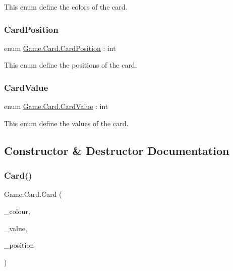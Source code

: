 This enum define the colors of the card. \mbox{\label{class_game_1_1_card_a9b35cee58d08386bc6f1d3cc7e6c6999}} 
\subsubsection{\texorpdfstring{Card\+Position}{CardPosition}}
{\footnotesize\ttfamily enum \hyperlink{class_game_1_1_card_a9b35cee58d08386bc6f1d3cc7e6c6999}{Game.\+Card.\+Card\+Position} \+: int\hspace{0.3cm}{\ttfamily [strong]}}

This enum define the positions of the card. \mbox{\label{class_game_1_1_card_a17c2bb5fb12e206639e218492d78578a}} 
\subsubsection{\texorpdfstring{Card\+Value}{CardValue}}
{\footnotesize\ttfamily enum \hyperlink{class_game_1_1_card_a17c2bb5fb12e206639e218492d78578a}{Game.\+Card.\+Card\+Value} \+: int\hspace{0.3cm}{\ttfamily [strong]}}

This enum define the values of the card. 

\subsection{Constructor \& Destructor Documentation}
\mbox{\label{class_game_1_1_card_ac495ed67b2e07198c0b2193ad4422c90}} 
\subsubsection{\texorpdfstring{Card()}{Card()}}
{\footnotesize\ttfamily Game.\+Card.\+Card (\begin{DoxyParamCaption}\item[{\hyperlink{class_game_1_1_card_a76a5a259d3d61f379fb2354192753789}{Card\+Colour}}]{\+\_\+colour,  }\item[{\hyperlink{class_game_1_1_card_a17c2bb5fb12e206639e218492d78578a}{Card\+Value}}]{\+\_\+value,  }\item[{\hyperlink{class_game_1_1_card_a9b35cee58d08386bc6f1d3cc7e6c6999}{Card\+Position}}]{\+\_\+position }\end{DoxyParamCaption})\hspace{0.3cm}{\ttfamily [inline]}}

